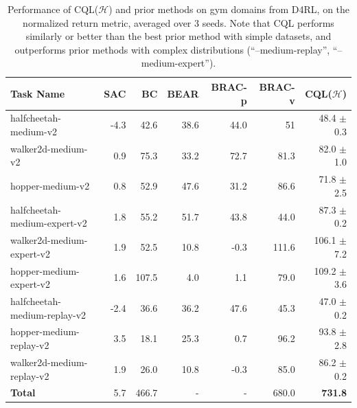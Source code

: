\begin{table}[h]
\captionsetup{font=small}
\centering
\fontsize{9}{9}\selectfont

\begin{tabular}{l|r|r|r|r|r||r}
\hline
\textbf{Task Name} & \textbf{SAC} & \textbf{BC} & \textbf{BEAR} & \textbf{BRAC-p} & \textbf{BRAC-v} & \textbf{CQL($\mathcal{H}$)}\\ \hline
halfcheetah-medium-v2 & -4.3 & 42.6 & 38.6 & {44.0} & {51} & {48.4 $\pm$ 0.3}\\
walker2d-medium-v2 & 0.9 & 75.3  & 33.2 & 72.7 & {81.3} & {82.0 $\pm$ 1.0}\\
hopper-medium-v2 & 0.8 & 52.9 & 47.6 & 31.2 & {86.6} & {71.8 $\pm$ 2.5}\\ \hline
halfcheetah-medium-expert-v2 & 1.8 & 55.2 & 51.7 & 43.8 & 44.0 & {87.3 $\pm$ 0.2}\\
walker2d-medium-expert-v2 & 1.9 & 52.5 & 10.8 & -0.3 & {111.6} & {106.1 $\pm$ 7.2}\\
hopper-medium-expert-v2 & 1.6 & 107.5 & 4.0 & 1.1 & 79.0 & {109.2 $\pm$ 3.6}\\ \hline
halfcheetah-medium-replay-v2 & -2.4 & 36.6 & 36.2 & {47.6} & {45.3} & {47.0 $\pm$ 0.2} \\
hopper-medium-replay-v2 & 3.5 & 18.1 & 25.3 & 0.7 & {96.2} & {93.8 $\pm$ 2.8}\\
walker2d-medium-replay-v2 & 1.9 & 26.0 & 10.8 & -0.3 & {85.0} & {86.2 $\pm$ 0.2}\\
\hline
\textbf{Total} & 5.7 & 466.7 & - & - & 680.0 & \textbf{731.8}\\
\hline
\end{tabular}
\vspace{0.05cm}
\caption{\label{table:mujoco}{\small Performance of CQL($\mathcal{H}$) and prior methods on gym domains from D4RL, on the normalized return metric, averaged over 3 seeds. Note that CQL performs similarly or better than the best prior method with simple datasets, and outperforms prior methods with complex distributions (``--medium-replay'', ``--medium-expert'').}}
\normalsize
\vspace{-10pt}
\end{table}



